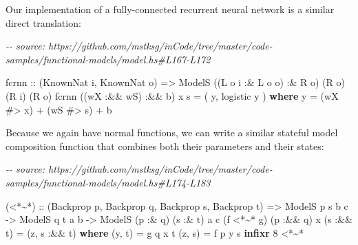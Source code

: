 \documentclass[]{article}
\newenvironment{Shaded}{}{}
\newcommand{\CommentTok}[1]{\textcolor[rgb]{0.38,0.63,0.69}{\textit{#1}}}
\newcommand{\DataTypeTok}[1]{\textcolor[rgb]{0.56,0.13,0.00}{#1}}
\newcommand{\DecValTok}[1]{\textcolor[rgb]{0.25,0.63,0.44}{#1}}
\newcommand{\KeywordTok}[1]{\textcolor[rgb]{0.00,0.44,0.13}{\textbf{#1}}}
\newcommand{\NormalTok}[1]{#1}
\newcommand{\OperatorTok}[1]{\textcolor[rgb]{0.40,0.40,0.40}{#1}}
\newcommand{\OtherTok}[1]{\textcolor[rgb]{0.00,0.44,0.13}{#1}}
\begin{document}
Our implementation of a fully-connected recurrent neural network is a similar
direct translation:

\begin{Shaded}
\begin{Highlighting}[]
\CommentTok{{-}{-} source: https://github.com/mstksg/inCode/tree/master/code{-}samples/functional{-}models/model.hs\#L167{-}L172}

\NormalTok{fcrnn}
\OtherTok{    ::}\NormalTok{ (}\DataTypeTok{KnownNat}\NormalTok{ i, }\DataTypeTok{KnownNat}\NormalTok{ o)}
    \OtherTok{=>} \DataTypeTok{ModelS}\NormalTok{ ((}\DataTypeTok{L}\NormalTok{ o i }\OperatorTok{:\&} \DataTypeTok{L}\NormalTok{ o o) }\OperatorTok{:\&} \DataTypeTok{R}\NormalTok{ o) (}\DataTypeTok{R}\NormalTok{ o) (}\DataTypeTok{R}\NormalTok{ i) (}\DataTypeTok{R}\NormalTok{ o)}
\NormalTok{fcrnn ((wX }\OperatorTok{:\&\&}\NormalTok{ wS) }\OperatorTok{:\&\&}\NormalTok{ b) x s }\OtherTok{=}\NormalTok{ ( y, logistic y )}
  \KeywordTok{where}
\NormalTok{    y  }\OtherTok{=}\NormalTok{ (wX }\OperatorTok{\#>}\NormalTok{ x) }\OperatorTok{+}\NormalTok{ (wS }\OperatorTok{\#>}\NormalTok{ s) }\OperatorTok{+}\NormalTok{ b}
\end{Highlighting}
\end{Shaded}

Because we again have normal functions, we can write a similar stateful model
composition function that combines both their parameters and their states:

\begin{Shaded}
\begin{Highlighting}[]
\CommentTok{{-}{-} source: https://github.com/mstksg/inCode/tree/master/code{-}samples/functional{-}models/model.hs\#L174{-}L183}

\NormalTok{(}\OperatorTok{<*\textasciitilde{}*}\NormalTok{)}
\OtherTok{  ::}\NormalTok{ (}\DataTypeTok{Backprop}\NormalTok{ p, }\DataTypeTok{Backprop}\NormalTok{ q, }\DataTypeTok{Backprop}\NormalTok{ s, }\DataTypeTok{Backprop}\NormalTok{ t)}
    \OtherTok{=>} \DataTypeTok{ModelS}\NormalTok{  p        s       b c}
    \OtherTok{{-}>} \DataTypeTok{ModelS}\NormalTok{       q        t  a b}
    \OtherTok{{-}>} \DataTypeTok{ModelS}\NormalTok{ (p }\OperatorTok{:\&}\NormalTok{ q) (s }\OperatorTok{:\&}\NormalTok{ t) a c}
\NormalTok{(f }\OperatorTok{<*\textasciitilde{}*}\NormalTok{ g) (p }\OperatorTok{:\&\&}\NormalTok{ q) x (s }\OperatorTok{:\&\&}\NormalTok{ t) }\OtherTok{=}\NormalTok{ (z, s\textquotesingle{} }\OperatorTok{:\&\&}\NormalTok{ t\textquotesingle{})}
  \KeywordTok{where}
\NormalTok{    (y, t\textquotesingle{}) }\OtherTok{=}\NormalTok{ g q x t}
\NormalTok{    (z, s\textquotesingle{}) }\OtherTok{=}\NormalTok{ f p y s}
\KeywordTok{infixr} \DecValTok{8} \OperatorTok{<*\textasciitilde{}*}
\end{Highlighting}
\end{Shaded}
\end{document}
